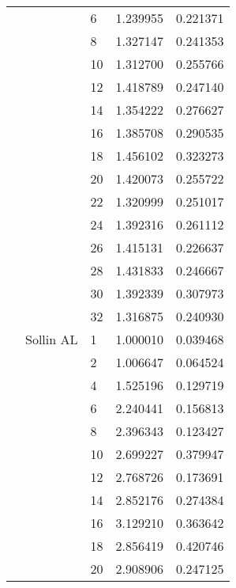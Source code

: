 \begin{tabular}{lllrr}
                      &            & 6  &  1.239955 &  0.221371 \\
                      &            & 8  &  1.327147 &  0.241353 \\
                      &            & 10 &  1.312700 &  0.255766 \\
                      &            & 12 &  1.418789 &  0.247140 \\
                      &            & 14 &  1.354222 &  0.276627 \\
                      &            & 16 &  1.385708 &  0.290535 \\
                      &            & 18 &  1.456102 &  0.323273 \\
                      &            & 20 &  1.420073 &  0.255722 \\
                      &            & 22 &  1.320999 &  0.251017 \\
                      &            & 24 &  1.392316 &  0.261112 \\
                      &            & 26 &  1.415131 &  0.226637 \\
                      &            & 28 &  1.431833 &  0.246667 \\
                      &            & 30 &  1.392339 &  0.307973 \\
                      &            & 32 &  1.316875 &  0.240930 \\
                      & Sollin AL & 1  &  1.000010 &  0.039468 \\
                      &            & 2  &  1.006647 &  0.064524 \\
                      &            & 4  &  1.525196 &  0.129719 \\
                      &            & 6  &  2.240441 &  0.156813 \\
                      &            & 8  &  2.396343 &  0.123427 \\
                      &            & 10 &  2.699227 &  0.379947 \\
                      &            & 12 &  2.768726 &  0.173691 \\
                      &            & 14 &  2.852176 &  0.274384 \\
                      &            & 16 &  3.129210 &  0.363642 \\
                      &            & 18 &  2.856419 &  0.420746 \\
                      &            & 20 &  2.908906 &  0.247125 \\

\end{tabular}
